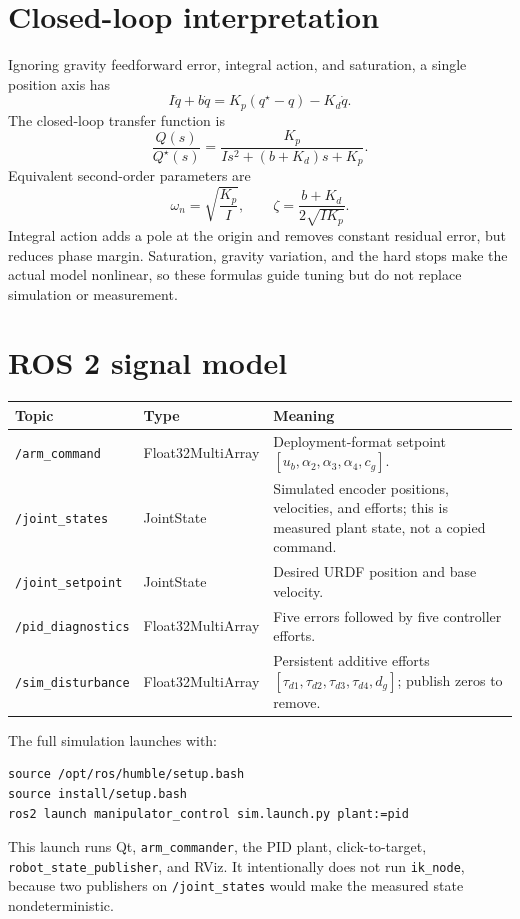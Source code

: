 \documentclass[11pt,a4paper]{article}
\newcommand{\code}[1]{\texttt{#1}}
\begin{document}
\section{Closed-loop interpretation}
Ignoring gravity feedforward error, integral action, and saturation, a single
position axis has
\[
I\ddot q+b\dot q=K_p(q^{\star}-q)-K_d\dot q.
\]
The closed-loop transfer function is
\begin{equation}
\frac{Q(s)}{Q^{\star}(s)}=
\frac{K_p}{Is^2+(b+K_d)s+K_p}.
\end{equation}
Equivalent second-order parameters are
\[
\omega_n=\sqrt{\frac{K_p}{I}},\qquad
\zeta=\frac{b+K_d}{2\sqrt{IK_p}}.
\]
Integral action adds a pole at the origin and removes constant residual error,
but reduces phase margin. Saturation, gravity variation, and the hard stops make
the actual model nonlinear, so these formulas guide tuning but do not replace
simulation or measurement.

\section{ROS 2 signal model}
\begin{longtable}{p{}p{}p{}}
\toprule Topic & Type & Meaning\\\midrule
\endhead
\code{/arm\_command} & Float32MultiArray & Deployment-format setpoint
$[u_b,\alpha_2,\alpha_3,\alpha_4,c_g]$.\\
\code{/joint\_states} & JointState & Simulated encoder positions, velocities,
and efforts; this is measured plant state, not a copied command.\\
\code{/joint\_setpoint} & JointState & Desired URDF position and base velocity.\\
\code{/pid\_diagnostics} & Float32MultiArray & Five errors followed by five
controller efforts.\\
\code{/sim\_disturbance} & Float32MultiArray & Persistent additive efforts
$[\tau_{d1},\tau_{d2},\tau_{d3},\tau_{d4},d_g]$; publish zeros to remove.\\
\bottomrule
\end{longtable}
The full simulation launches with:
\begin{lstlisting}
source /opt/ros/humble/setup.bash
source install/setup.bash
ros2 launch manipulator_control sim.launch.py plant:=pid
\end{lstlisting}
This launch runs Qt, \code{arm\_commander}, the PID plant, click-to-target,
\code{robot\_state\_publisher}, and RViz. It intentionally does not run
\code{ik\_node}, because two publishers on \code{/joint\_states} would make the
measured state nondeterministic.
\end{document}
